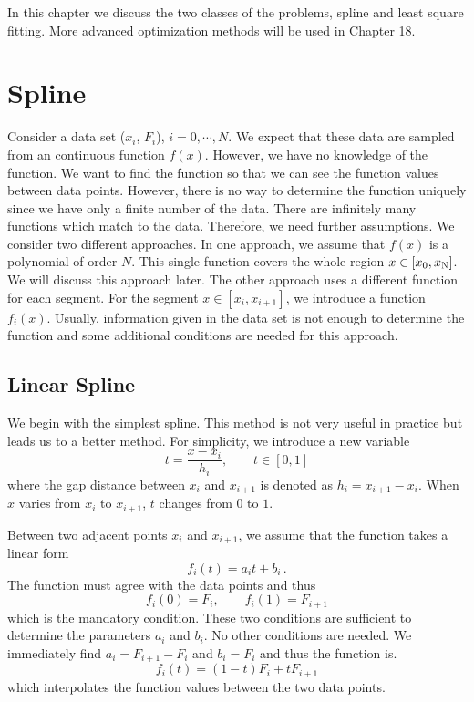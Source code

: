 In this chapter we discuss the two classes of the problems, spline and least square fitting.  More advanced optimization methods will be used in Chapter 18.

\section{Spline}

Consider a data set ($x_i$, $F_i$), $i=0, \cdots, N$.  We expect that these data are sampled from an continuous function $f(x)$. However, we have no knowledge of the function. We want to find the function so that we can see the function values between data points. 
However, there is no way to determine the function uniquely since we have only a finite number of the data. There are infinitely many functions which match to the data.  Therefore,  we need further assumptions.  We consider two different approaches.  In one approach, we assume that $f(x)$ is a polynomial of order $N$.  This single function covers the whole region $x \in [x_0, x_\textsc{N}]$. We will discuss this approach later.
The other approach uses a different function for each segment.  For the segment  $x \in [x_i, x_{i+1}]$, we introduce a function
$f_i(x)$. Usually, information given in the data set is not enough to determine the function and some additional conditions are needed for this approach.

\subsection{Linear Spline}

We begin with the simplest spline.  This method is not very useful in practice but leads us to a better method. 
For simplicity, we introduce a new variable 
\begin{equation}
t = \frac{x-x_i}{h_i}, \qquad t \in [0,1]
\end{equation}
where the gap distance between $x_i$ and $x_{i+1}$ is denoted as $h_i = x_{i+1}-x_i$.  When $x$ varies from $x_i$ to $x_{i+1}$, $t$ changes from $0$ to $1$. 

Between two adjacent points $x_i$ and $x_{i+1}$,  we assume that the function takes a linear form
\begin{equation}\label{eq:spilne_linear1}
f_i(t) = a_i t + b_i\,.
\end{equation}
The function must agree with the data points and thus
\begin{equation}\label{eq:spline_rule1}
f_i(0) = F_i, \qquad f_i(1)=F_{i+1}
\end{equation}
which is the mandatory condition.  These two conditions are sufficient to determine the parameters $a_i$ and $b_i$. No other conditions are needed.  We immediately find $a_i = F_{i+1}-F_i$ and $b_i = F_i$ and thus the function is.
\begin{equation}\label{eq:spline_linear2}
f_i(t) = (1-t) F_i + t F_{i+1}
\end{equation}
which interpolates the function values between the two data points.


